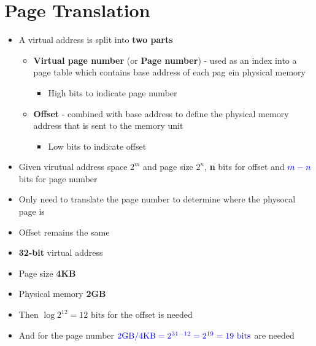 \documentclass[a4paper,11pt,english]{article}
\begin{document}
\section*{Page Translation}
\begin{itemize}
    \item A virtual address is split into \textbf{\color{blue} two parts}
        \begin{itemize}
            \item \textbf{\color{blue} Virtual page number} (or \textbf{\color{blue} Page number}) - used as an index into a page table
                which contains base address of each pag ein physical memory
                \begin{itemize}
                    \item High bits to indicate page number
                \end{itemize}
            \item \textbf{\color{blue} Offset} - combined with base address to define the physical memory address that is sent to the memory unit
                \begin{itemize}
                    \item Low bits to indicate offset
                \end{itemize}
        \end{itemize}
    \item Given virutual address space $2^m$ and page size $2^n$, \textbf{\color{blue} n} bits for offset and $\color{blue}m-n$ bits for page number
    \item Only need to translate the page number to determine where the physocal page is
    \item Offset remains the same
    \item \textbf{\color{blue} 32-bit} virtual address
    \item Page size \textbf{\color{blue} 4KB}
    \item Physical memory \textbf{\color{blue} 2GB}
    \item Then $\log{2^{12}} = \text{12 bits}$ for the offset is needed
    \item And for the page number $\color{blue} \text{2GB}/\text{4KB} = 2^{31-12} = 2^{19} = \text{19 bits}$ are needed
\end{itemize}
\end{document}
